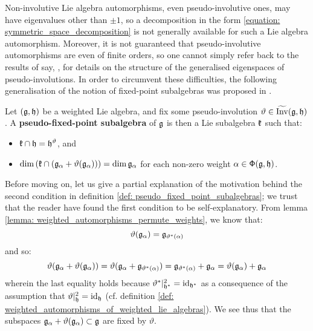         Non-involutive Lie algebra automorphisms, even pseudo-involutive ones, may have eigenvalues other than $\pm 1$, so a decomposition in the form \eqref{equation: symmetric_space_decomposition} is not generally available for such a Lie algebra automorphism. Moreover, it is not guaranteed that pseudo-involutive automorphisms are even of finite orders, so one cannot simply refer back to the results of say, \cite[Chapter 8]{kac_infinite_dimensional_lie_algebras}, for details on the structure of the generalised eigenspaces of pseudo-involutions. In order to circumvent these difficulties, the following generalisation of the notion of fixed-point subalgebras was proposed in \cite[Definition 1.2]{regelskis_vlaar_kac_moody_pseudo_symmetric_pairs}. 
        \begin{definition} \label{def: pseudo_fixed_point_subalgebras}
            Let $(\mathfrak{g}, \mathfrak{h})$ be a weighted Lie algebra, and fix some pseudo-involution $\vartheta \in \widetilde{\operatorname{Inv}}(\mathfrak{g}, \mathfrak{h})$. A \textbf{pseudo-fixed-point subalgebra} of $\mathfrak{g}$ is then a Lie subalgebra $\mathfrak{k}$ such that:
            \begin{itemize}
                \item $\mathfrak{k} \cap \mathfrak{h} = \mathfrak{h}^{\vartheta}$, and
                \item $\dim\left( \mathfrak{k} \cap ( \mathfrak{g}_{\alpha} + \vartheta(\mathfrak{g}_{\alpha}) ) \right) = \dim \mathfrak{g}_{\alpha}$ for each non-zero weight $\alpha \in \mathsf{\Phi}(\mathfrak{g}, \mathfrak{h})$.
            \end{itemize}
        \end{definition}
        \begin{remark}
            Before moving on, let us give a partial explanation of the motivation behind the second condition in definition \ref{def: pseudo_fixed_point_subalgebras}; we trust that the reader have found the first condition to be self-explanatory. From lemma \ref{lemma: weighted_automorphisms_permute_weights}, we know that:
                $$\vartheta(\mathfrak{g}_{\alpha}) = \mathfrak{g}_{\vartheta^*(\alpha)}$$
            and so:
                $$\vartheta( \mathfrak{g}_{\alpha} + \vartheta(\mathfrak{g}_{\alpha}) ) = \vartheta( \mathfrak{g}_{\alpha} + \mathfrak{g}_{\vartheta^*(\alpha)} ) = \mathfrak{g}_{\vartheta^*(\alpha)} + \mathfrak{g}_{\alpha} = \vartheta(\mathfrak{g}_{\alpha}) + \mathfrak{g}_{\alpha}$$
            wherein the last equality holds because $\vartheta^*|_{\mathfrak{h}^*}^2 = \mathrm{id}_{\mathfrak{h}^*}$ as a consequence of the assumption that $\vartheta|_{\mathfrak{h}}^2 = \mathrm{id}_{\mathfrak{h}}$ (cf. definition \ref{def: weighted_automorphisms_of_weighted_lie_algebras}). We see thus that the subspaces $\mathfrak{g}_{\alpha} + \vartheta(\mathfrak{g}_{\alpha}) \subset \mathfrak{g}$ are fixed by $\vartheta$.
            
        \end{remark}

